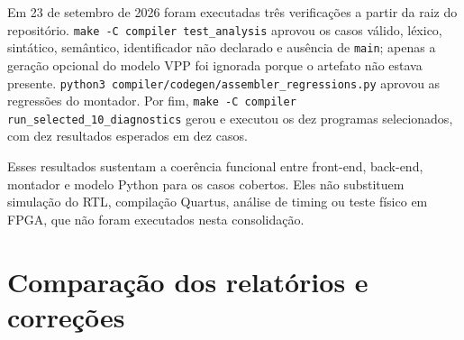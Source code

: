 \documentclass[
  12pt,
  oneside,
  a4paper,
  english,
  french,
  spanish,
  brazilian,
]{abntex2}
\begin{document}
Em 23 de setembro de 2026 foram executadas três verificações a partir da raiz do repositório. \texttt{make -C compiler test\_analysis} aprovou os casos válido, léxico, sintático, semântico, identificador não declarado e ausência de \texttt{main}; apenas a geração opcional do modelo VPP foi ignorada porque o artefato não estava presente. \texttt{python3 compiler/codegen/assembler\_regressions.py} aprovou as regressões do montador. Por fim, \texttt{make -C compiler run\_selected\_10\_diagnostics} gerou e executou os dez programas selecionados, com dez resultados esperados em dez casos.

Esses resultados sustentam a coerência funcional entre front-end, back-end, montador e modelo Python para os casos cobertos. Eles não substituem simulação do RTL, compilação Quartus, análise de timing ou teste físico em FPGA, que não foram executados nesta consolidação.

\chapter{Comparação dos relatórios e correções}
\label{cap:comparacao}
\end{document}
